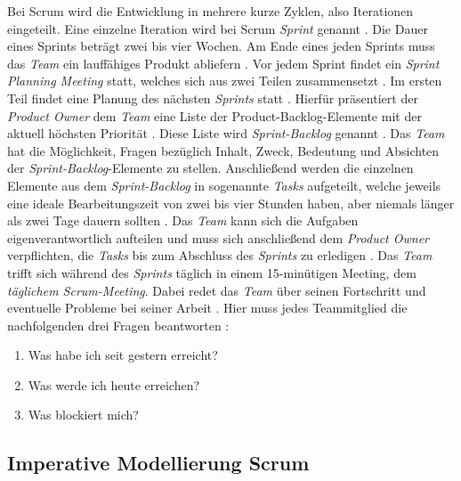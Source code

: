 Bei Scrum wird die Entwicklung in mehrere kurze Zyklen, also Iterationen eingeteilt. Eine einzelne Iteration wird bei Scrum \textit{Sprint} genannt \cite{Henning2011}. Die Dauer eines Sprints beträgt zwei bis vier Wochen. Am Ende eines jeden Sprints muss das \textit{Team} ein lauffähiges Produkt abliefern \cite{Wolf2011}. Vor jedem Sprint findet ein \textit{Sprint Planning Meeting} statt, welches sich aus zwei Teilen zusammensetzt \cite{Pichler2010}. Im ersten Teil findet eine Planung des nächsten \textit{Sprints} statt \cite{Lacey2012}. Hierfür präsentiert der \textit{Product Owner} dem \textit{Team} eine Liste der Product-Backlog-Elemente mit der aktuell höchsten Priorität \cite{Schwaber2004, Schwaber2007,Pichler2010}. Diese Liste wird \textit{Sprint-Backlog} genannt \cite{Wolf2011}. Das \textit{Team} hat die Möglichkeit, Fragen bezüglich Inhalt, Zweck, Bedeutung und Absichten der \textit{Sprint-Backlog}-Elemente zu stellen. Anschließend werden die einzelnen Elemente aus dem \textit{Sprint-Backlog} in sogenannte \textit{Tasks} aufgeteilt, welche jeweils eine ideale Bearbeitungszeit von zwei bis vier Stunden haben, aber niemals länger als zwei Tage dauern sollten \cite{Wolf2011}. Das \textit{Team} kann sich die Aufgaben eigenverantwortlich aufteilen und muss sich anschließend dem \textit{Product  Owner} verpflichten, die \textit{Tasks} bis zum Abschluss des \textit{Sprints} zu erledigen \cite{Wolf2011, Keith2010,Pichler2010}.
Das  \textit{Team} trifft sich während des \textit{Sprints} täglich in einem 15-minütigen Meeting, dem \textit{täglichem Scrum-Meeting}. Dabei redet das \textit{Team} über seinen Fortschritt und eventuelle Probleme bei seiner Arbeit \cite{Keith2010}. Hier muss jedes Teammitglied die nachfolgenden drei Fragen beantworten \cite{Wolf2011}:
   \begin{enumerate}
      \item Was habe ich seit gestern erreicht?
      \item Was werde ich heute erreichen?
      \item Was blockiert mich?
      \end {enumerate}
      
\subsection{Imperative Modellierung Scrum}

